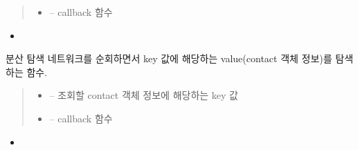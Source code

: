 \documentclass[a4paper,10pt,english]{sphinxmanual}
\begin{document}
\begin{fulllineitems}
\begin{fulllineitems}
\begin{quote}
\begin{description}
\begin{itemize}
\item {} 
\sphinxAtStartPar
{} – callback 함수

\end{itemize}

\end{description}\end{quote}


\nopagebreak

\begin{itemize}
\item {} 
\sphinxAtStartPar
{\hyperref[\detokenize{_kademlia:KNode.set}]{}}

\end{itemize}



\end{fulllineitems}


\begin{fulllineitems}
\label{\detokenize{_kademlia:KNode._iterativeFindValue}}
\pysigstartsignatures
{}
\pysigstopsignatures
\sphinxAtStartPar
분산 탐색 네트워크를 순회하면서 key 값에 해당하는 value(contact 객체 정보)를 탐색하는 함수.
\begin{quote}\begin{description}
\begin{itemize}
\item {} 
\sphinxAtStartPar
{} – 조회할 contact 객체 정보에 해당하는 key 값

\item {} 
\sphinxAtStartPar
{} – callback 함수

\end{itemize}

\end{description}\end{quote}


\nopagebreak

\begin{itemize}
\item {} 
\sphinxAtStartPar
{\hyperref[\detokenize{_kademlia:KNode.get}]{}}


\end{itemize}
\end{fulllineitems}
\end{fulllineitems}
\end{document}
